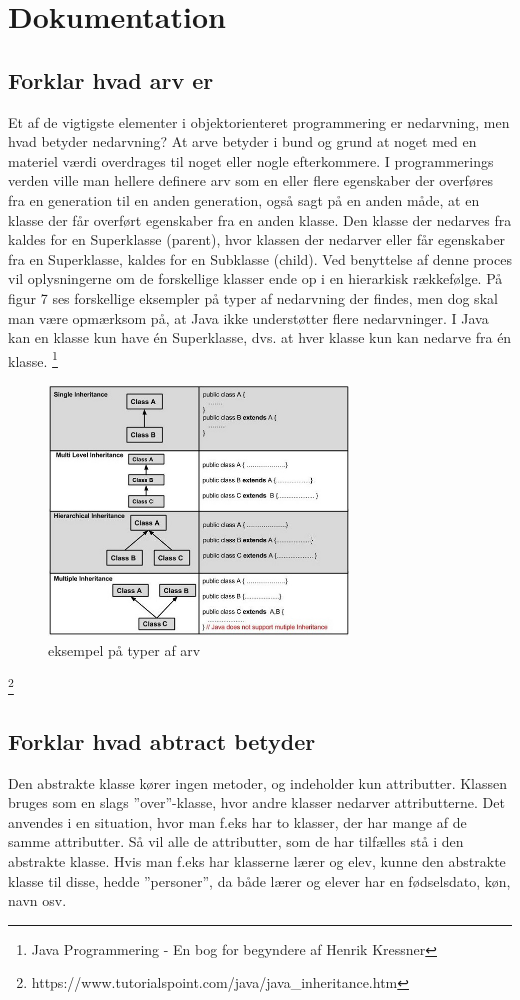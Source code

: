 \section{Dokumentation}
\subsection{Forklar hvad arv er}

Et af de vigtigste elementer i objektorienteret programmering er nedarvning, men hvad betyder nedarvning? At arve betyder i bund og grund at noget med en materiel værdi overdrages til noget eller nogle efterkommere. I programmerings verden ville man hellere definere arv som en eller flere egenskaber der overføres fra en generation til en anden generation, også sagt på en anden måde, at en klasse der får overført egenskaber fra en anden klasse. Den klasse der nedarves fra kaldes for en Superklasse (parent), hvor klassen der nedarver eller får egenskaber fra en Superklasse, kaldes for en Subklasse (child).
Ved benyttelse af denne proces vil oplysningerne om de forskellige klasser ende op i en hierarkisk rækkefølge. 
På figur 7 ses forskellige eksempler på typer af nedarvning der findes, men dog skal man være opmærksom på, at Java ikke understøtter flere nedarvninger. I Java kan en klasse kun have én Superklasse, dvs. at hver klasse kun kan nedarve fra én klasse. \footnote{ Java Programmering - En bog for begyndere af Henrik Kressner}

\begin{figure}[h]\label{fig:types_of_inheritance.jpg} 
    \includegraphics[width=8cm]{fig/types_of_inheritance.jpg}
    \caption{eksempel på typer af arv}
\end{figure}
\footnote{https://www.tutorialspoint.com/java/java_inheritance.htm}
\subsection{Forklar hvad abtract betyder}
Den abstrakte klasse kører ingen metoder, og indeholder kun attributter. Klassen bruges som en slags ”over”-klasse, hvor andre klasser nedarver attributterne. Det anvendes i en situation, hvor man f.eks har to klasser, der har mange af de samme attributter. Så vil alle de attributter, som de har tilfælles stå i den abstrakte klasse.
Hvis man f.eks har klasserne lærer og elev, kunne den abstrakte klasse til disse, hedde ”personer”, da både lærer og elever har en fødselsdato, køn, navn osv.

